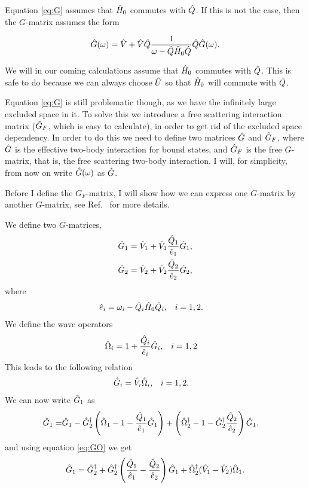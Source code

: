 Equation \ref{eq:G} assumes that $\hat{H}_0$ commutes with $\hat{Q}$. If this is not the
case, then the $G$-matrix assumes the form

\begin{align}
	\g(\omega) = \v+\v\q\frac{1}{\omega -\q\h_0\q}\q\g(\omega ).
	\label{eq:G2}
\end{align}

We will in our coming calculations assume that $\hat{H}_0$ commutes with $\hat{Q}$. This
is safe to do because we can always choose $\hat{U}$ so that $\hat{H}_0$ will commute
with $\hat{Q}$.

Equation \ref{eq:G} is still problematic though, as we have the infinitely
large excluded space in it. To solve this we introduce a free scattering
interaction matrix ($\hat{G}_F$, which is easy to calculate), in order to get rid of
the excluded space dependency. In order to do this we need to define two
matrices $\hat{G}$ and $\hat{G}_F$, where $\hat{G}$ is the effective two-body interaction for
bound states, and $\hat{G}_F$ is the free $G$-matrix, that is, the free scattering
two-body interaction. I will, for simplicity, from now on write $\hat{G}(\omega)$ as
$\hat{G}$.

Before I define the $G_F$-matrix, I will show how we can express one $G$-matrix by another $G$-matrix, see Ref.~\cite{g261}
for more details.

We define two $G$-matrices,
\begin{align}
	\hat{G}_1 &= \hat{V}_1 + \hat{V}_1\frac{\hat{Q}_1}{\hat{e}_1}\hat{G}_1,\\
	\hat{G}_2 &= \hat{V}_2 + \hat{V}_2\frac{\hat{Q}_2}{\hat{e}_2}\hat{G}_2,
\end{align}
where
\begin{align}
	\hat{e}_i &= \omega_i - \hat{Q}_i\hat{H}_0\hat{Q}_i,& i &= 1,2. \notag
\end{align}
We define the wave operators
\begin{align}
	\hat{\Omega}_i &= 1 + \frac{\hat{Q}_i}{\hat{e}_i}\hat{G}_i,& i &= 1,2
\end{align}
This leads to the following relation
\begin{align}
	\g_i &= \v_i\o_i,& i &= 1,2.
	\label{eq:GO}
\end{align}
We can now write $\hat{G}_1$ as
\begin{align}
	\hat{G}_1 = &\hat{G}_1 - \hat{G}_2^{\dagger}\left(\hat{\Omega}_1-1-\frac{\hat{Q}_1}{\hat{e}_1}\hat{G}_1\right)
	+ \left(\hat{\Omega}_2^{\dagger}-1-\hat{G}_2^{\dagger}\frac{\hat{Q}_2}{\hat{e}_2}\right)\hat{G}_1,
\end{align}
and using equation \ref{eq:GO} we get
\begin{align}
	\g_1 = \g_2^{\dagger} + \g_2^{\dagger}
	\left(\frac{\q_1}{\e_1}-\frac{\q_2}{\e_2}\right)\g_1
	+ \o_2^{\dagger}(\v_1-\v_2)\o_1.
	\label{eq:G12}
\end{align}

